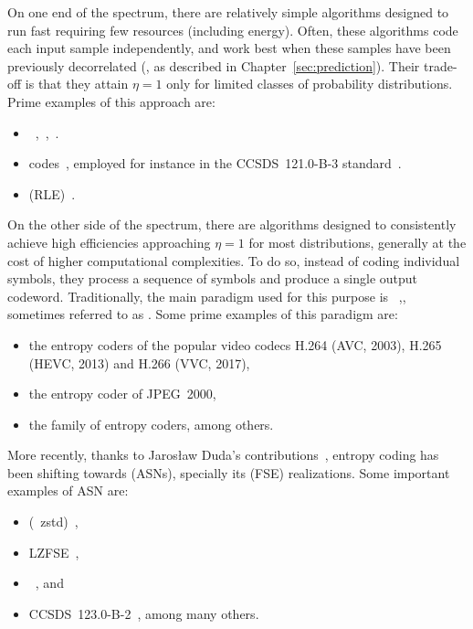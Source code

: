 On one end of the spectrum, there are relatively simple algorithms designed to run fast
requiring few resources (including energy).
%
Often, these algorithms code each input sample
independently, and work best when these samples have been previously decorrelated
(\eg, as described in Chapter~\ref{sec:prediction}).
%
Their trade-off is that they attain $\eta=1$ only for limited classes of probability distributions.
%
Prime examples of this approach are:
\begin{itemize}
    \item {}~\cite[\S 3.2--3.3]{sayood_introduction},~\cite[\S 2.2.1]{taubman2002jpeg2000},~\cite[\S 5.6--5.7]{cover_elements}.
    \item {} codes~\cite[\S 3.5--3.6]{sayood_introduction}, employed for instance in the CCSDS~121.0-B-3 standard~\cite[\S 3.2--3.3]{ccsds121x0b3}.
    \item {} (RLE)~\cite{golomb_rle}.
\end{itemize}

On the other side of the spectrum, there are algorithms designed to consistently achieve high efficiencies approaching $\eta=1$
for most distributions, generally at the cost of higher computational complexities. To do so, instead of coding individual symbols,
they process a sequence of symbols and produce a single output codeword. Traditionally,
the main paradigm used for this purpose is
~\cite[\S 4]{sayood_introduction},\cite[\S 2.3]{taubman2002jpeg2000},
sometimes referred to as . Some prime examples of this paradigm are:
    \begin{itemize}
    \item the  entropy coders of the popular video codecs H.264 (AVC, 2003), H.265 (HEVC, 2013) and H.266 (VVC, 2017),
    \item the  entropy coder of JPEG~2000,
    \item the  family of entropy coders, among others.
    \end{itemize}

More recently, thanks to Jarosław Duda's contributions~\cite{duda_asn}, entropy coding
has been shifting towards  (ASNs), specially its
 (FSE) realizations. Some important examples of ASN are:
    \begin{itemize}
    \item {} (\aka\ zstd)~\cite{collet_zstd},
    \item LZFSE~\cite{lzfse},
    \item {}~\cite{jpeg_xl}, and
    \item CCSDS~123.0-B-2~\cite{ccsds123x0b2}, among many others.
    \end{itemize}

